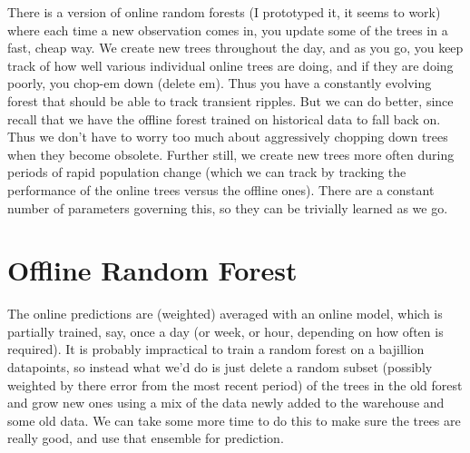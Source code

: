 \documentclass[a4paper,12pt]{article}
\begin{document}
There is a version of online random forests (I prototyped it, it seems to work) where each time a new observation comes in, you update some of the trees in a fast, cheap way.
We create new trees throughout the day, and as you go, you keep track of how well various individual online trees are doing, and if they are doing poorly, you chop-em down (delete em).
Thus you have a constantly evolving forest that should be able to track transient ripples.
But we can do better, since recall that we have the offline forest trained on historical data to fall back on.
Thus we don't have to worry too much about aggressively chopping down trees when they become obsolete.
Further still, we create new trees more often during periods of rapid population change (which we can track by tracking the performance of the online trees versus the offline ones). 
There are a constant number of parameters governing this, so they can be trivially learned as we go.  

\section*{Offline Random Forest}

The online predictions are (weighted) averaged with an online model, which is partially trained, say, once a day (or week, or hour, depending on how often is required).
It is probably impractical to train a random forest on a bajillion datapoints, so instead what we'd do is just delete a random subset (possibly weighted by there error from the most recent period) of the trees in the old forest and grow new ones using a mix of the data newly added to the warehouse and some old data.  
We can take some more time to do this to make sure the trees are really good, and use that ensemble for prediction.  
\end{document}
